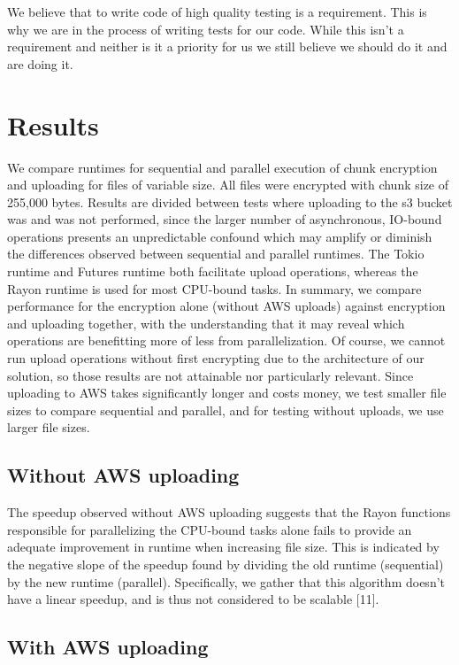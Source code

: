 \documentclass[conference]{IEEEtran}
\begin{document}
We believe that to write code of high quality testing is a requirement.
This is why we are in the process of writing tests for our code.
While this isn't a requirement and neither is it a priority for us we still believe we should do it and are doing it.

\section{Results}
We compare runtimes for sequential and parallel execution of chunk encryption and uploading for files of variable size.
All files were encrypted with chunk size of 255,000 bytes. Results are divided between tests where uploading to the s3 bucket 
was and was not performed, since the larger number of asynchronous, IO-bound operations presents an unpredictable confound 
which may amplify or diminish the differences observed between sequential and parallel runtimes. 
The Tokio runtime and Futures runtime both facilitate upload operations, whereas the Rayon runtime is used for most CPU-bound 
tasks. In summary, we compare performance for the encryption alone (without AWS uploads) against encryption and uploading together, 
with the understanding
that it may reveal which operations are benefitting more of less from parallelization. Of course, we cannot run upload operations
without first encrypting due to the architecture of our solution, so those results are not attainable nor particularly relevant.
Since uploading to AWS takes significantly longer and costs money, we test smaller file sizes to compare sequential and parallel, 
and for testing without uploads, we use larger file sizes. 

\subsection{Without AWS uploading}
The speedup observed without AWS uploading suggests that the Rayon functions responsible for parallelizing
the CPU-bound tasks alone fails to provide an adequate improvement in runtime when increasing file size. This is 
indicated by the negative slope of the speedup found by dividing the old runtime (sequential) by the new runtime (parallel).
Specifically, we gather that this algorithm doesn't have a linear speedup, and is thus not considered to be scalable [11].

\subsection{With AWS uploading}
\end{document}
